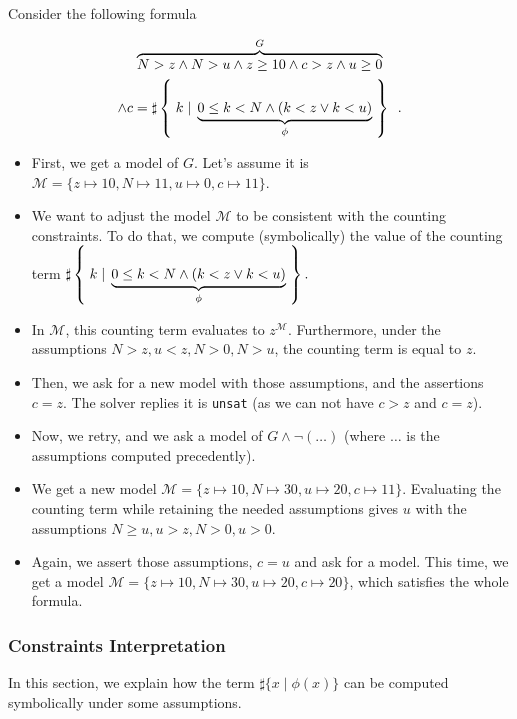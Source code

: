 \newpage
\begin{example}

Consider the following formula

\begin{multline*}
\overbrace{N > z \land N > u \land z \ge 10 \land c > z \land u \ge 0}^G \\
\land c = \sharp\left\lbrace\;k\;|\;\underbrace{0 \le k < N \land (k < z \lor k < u)}_\phi\;\right\rbrace\enspace.
\end{multline*}

\begin{itemize}
\item First, we get a model of $G$. Let's assume it is $\mathcal{M} = \{ z \mapsto 10, N \mapsto 11, u \mapsto 0, c \mapsto 11\}$.
\item We want to adjust the model $\mathcal{M}$ to be consistent with the
counting constraints. To do that, we compute (symbolically) the value of the
counting term $\sharp\left\lbrace\;k\;|\;\underbrace{0 \le k < N \land (k < z \lor k < u)}_\phi\;\right\rbrace.$
\item In $\mathcal{M}$, this counting term evaluates to $z^\mathcal{M}$. Furthermore, under the assumptions $N > z, u < z, N > 0, N > u$, the counting term is equal to $z$.
\item Then, we ask for a new model with those assumptions, and the assertions $c = z$. The solver replies it is \texttt{unsat} (as we can not have $c > z$ and $c = z$).
\item Now, we retry, and we ask a model of $G \land \lnot (\ldots)$ (where $\ldots$ is the assumptions computed precedently).
\item We get a new model $\mathcal{M} = \{ z \mapsto 10, N \mapsto 30, u \mapsto
20, c \mapsto 11\}$. Evaluating the counting term while retaining the needed
assumptions gives $u$ with the assumptions $N \ge u, u > z, N > 0, u > 0$.
\item Again, we assert those assumptions, $c = u$ and ask for a model. This
time, we get a model $\mathcal{M} = \{ z \mapsto 10, N \mapsto 30, u \mapsto 20,
c \mapsto 20\}$, which satisfies the whole formula.
\end{itemize}

\end{example}

\subsubsection{Constraints Interpretation}

In this section, we explain how the term $\sharp\{x\mid\phi(x)\}$ can be
computed symbolically under some assumptions.

